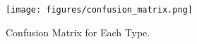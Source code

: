 \begin{figure}[h]
    \centering
    \texttt{[image: figures/confusion\_matrix.png]}
    \caption{Confusion Matrix for Each Type. }
    \label{fig:data_prep}
\end{figure}